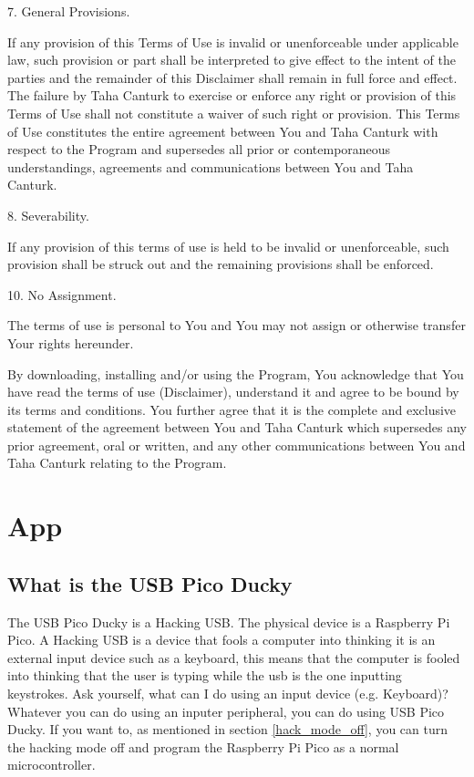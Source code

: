 \documentclass[a4paper,12pt]{article}
\begin{document}
7. General Provisions.

If any provision of this Terms of Use is invalid or unenforceable under applicable law, such provision or part shall be interpreted to give effect to the intent of the parties and the remainder of this Disclaimer shall remain in full force and effect. The failure by Taha Canturk to exercise or enforce any right or provision of this Terms of Use shall not constitute a waiver of such right or provision. This Terms of Use constitutes the entire agreement between You and Taha Canturk with respect to the Program and supersedes all prior or contemporaneous understandings, agreements and communications between You and Taha Canturk.

8. Severability.

If any provision of this terms of use is held to be invalid or unenforceable, such provision shall be struck out and the remaining provisions shall be enforced.

10. No Assignment.

The terms of use is personal to You and You may not assign or otherwise transfer Your rights hereunder.

By downloading, installing and/or using the Program, You acknowledge that You have read the terms of use (Disclaimer), understand it and agree to be bound by its terms and conditions. You further agree that it is the complete and exclusive statement of the agreement between You and Taha Canturk which supersedes any prior agreement, oral or written, and any other communications between You and Taha Canturk relating to the Program.

\newpage

\tableofcontents

\normalsize

\newpage

\section{App}

\subsection{What is the USB Pico Ducky}

The USB Pico Ducky is a Hacking USB. The physical device is a Raspberry Pi Pico. A Hacking USB is a device that fools a computer into thinking it is an external input device such as a keyboard, this means that the computer is fooled into thinking that the user is typing while the usb is the one inputting keystrokes. Ask yourself, what can I do using an input device (e.g. Keyboard)? Whatever you can do using an inputer peripheral, you can do using USB Pico Ducky. If you want to, as mentioned in section \ref{hack_mode_off}, you can turn the hacking mode off and program the Raspberry Pi Pico as a normal microcontroller.
\end{document}
